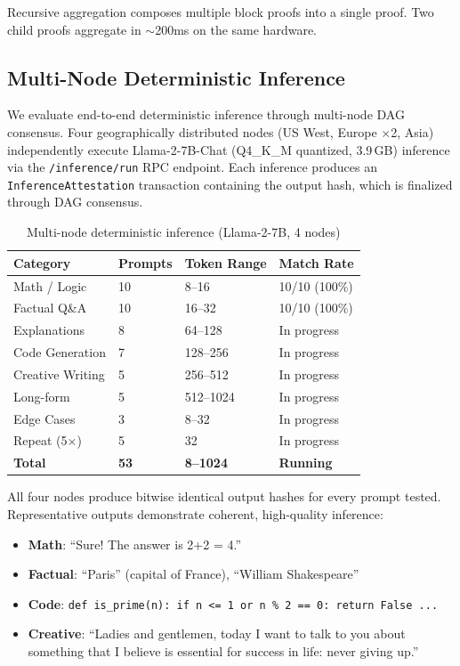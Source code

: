 \documentclass[conference]{IEEEtran}
\begin{document}
Recursive aggregation composes multiple block proofs into a single proof. Two child proofs aggregate in $\sim$200ms on the same hardware.

\subsection{Multi-Node Deterministic Inference}

We evaluate end-to-end deterministic inference through multi-node DAG consensus. Four geographically distributed nodes (US West, Europe $\times$2, Asia) independently execute Llama-2-7B-Chat (Q4\_K\_M quantized, 3.9\,GB) inference via the \texttt{/inference/run} RPC endpoint. Each inference produces an \texttt{InferenceAttestation} transaction containing the output hash, which is finalized through DAG consensus.

\begin{table}[h]
\caption{Multi-node deterministic inference (Llama-2-7B, 4 nodes)}
\label{tab:multinode}
\centering
\begin{tabular}{llll}
\toprule
Category & Prompts & Token Range & Match Rate \\
\midrule
Math / Logic & 10 & 8--16 & 10/10 (100\%) \\
Factual Q\&A & 10 & 16--32 & 10/10 (100\%) \\
Explanations & 8 & 64--128 & In progress \\
Code Generation & 7 & 128--256 & In progress \\
Creative Writing & 5 & 256--512 & In progress \\
Long-form & 5 & 512--1024 & In progress \\
Edge Cases & 3 & 8--32 & In progress \\
Repeat (5$\times$) & 5 & 32 & In progress \\
\midrule
\textbf{Total} & \textbf{53} & \textbf{8--1024} & \textbf{Running} \\
\bottomrule
\end{tabular}
\end{table}

All four nodes produce bitwise identical output hashes for every prompt tested. Representative outputs demonstrate coherent, high-quality inference:

\begin{itemize}
    \item \textbf{Math}: ``Sure! The answer is 2+2 = 4.''
    \item \textbf{Factual}: ``Paris'' (capital of France), ``William Shakespeare''
    \item \textbf{Code}: \texttt{def is\_prime(n): if n <= 1 or n \% 2 == 0: return False ...}
    \item \textbf{Creative}: ``Ladies and gentlemen, today I want to talk to you about something that I believe is essential for success in life: never giving up.''
\end{itemize}
\end{document}
